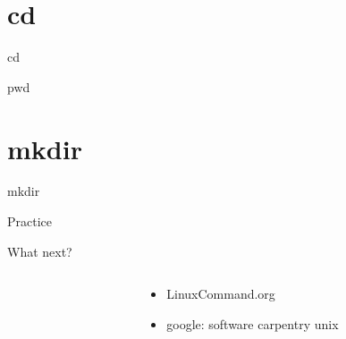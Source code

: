 \documentclass[xcolor=table]{beamer}
\begin{document}
\section{cd}
\begin{frame}
\begin{center}
\Huge cd
\end{center}
\end{frame}
\begin{frame}
\begin{center}
\Huge pwd
\end{center}
\end{frame}
\section{mkdir}
\begin{frame}
\begin{center}
\Huge mkdir
\end{center}
\end{frame}

\begin{frame}
  \begin{center}
  \Huge Practice
  \end{center}
\end{frame}

\begin{frame}{What next?}
\Large
\begin{columns}
\begin{column}{.2\textwidth}
\vspace{.1in}
\end{column}
\begin{column}{.8\textwidth}
\begin{center}
\begin{itemize}
\item LinuxCommand.org\\
\item google: software carpentry unix\\
\end{itemize}
\end{center}
\end{column}
\end{columns}

\end{frame}

\end{document}
